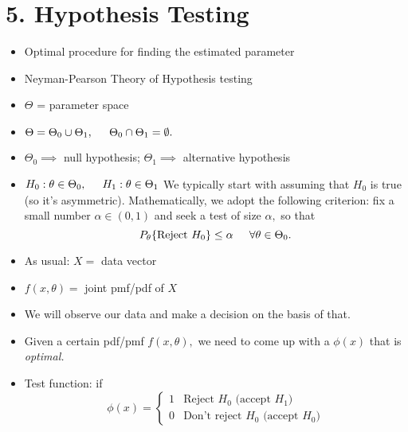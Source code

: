\documentclass[12pt]{report} \addtolength{\textheight}{2in}
\begin{document}
\section*{5. Hypothesis Testing}
\begin{itemize}
\item Optimal procedure for finding the estimated parameter
\item Neyman-Pearson Theory of Hypothesis testing
\item $\Theta$ = parameter space
\item $\Theta=\Theta_{0} \cup \Theta_{1}, \hspace{.2 in} \Theta_{0}\cap \Theta_{1} = \emptyset.$
\item $\Theta_{0} \implies$ null hypothesis; $\Theta_{1} \implies$ alternative hypothesis
\item $H_{0}: \theta \in \Theta_{0}, \hspace{.2in} H_{1}: \theta \in \Theta_1$
We typically start with assuming that $H_{0}$ is true (so it's asymmetric). Mathematically,  we adopt the following criterion: fix a small number $\alpha \in (0,1)$ and seek a test of size $\alpha,$ so that 
\begin{displaymath}
P_{\theta}\{\text{Reject  } H_{0}\} \leq \alpha \hspace{.2in} \forall \theta \in \Theta_{0}.
\end{displaymath}
\item As usual: $X=$ data vector
\item $f(x,\theta)=$ joint pmf/pdf of $X$
\item We will observe our data and make a decision on the basis of that. 
\item Given a certain pdf/pmf $f(x, \theta),$ we need to come up with a $\phi(x)$ that is \textit{optimal.}
\item Test function: if
\begin{displaymath}
\phi(x)=
\begin{cases}
1 & \text{Reject $H_{0}$ (accept $H_1$)}\\
0 & \text{Don't reject $H_{0}$ (accept $H_0$)}
\end{cases}
\end{displaymath}
\end{itemize}
\end{document}
